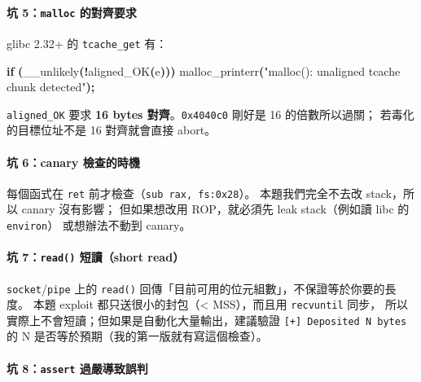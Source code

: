 \documentclass[10pt,a4paper]{article}
\newenvironment{Shaded}{\begin{snugshade}}{\end{snugshade}}
\newcommand{\ControlFlowTok}[1]{\textcolor[rgb]{0.13,0.29,0.53}{\textbf{#1}}}
\newcommand{\NormalTok}[1]{#1}
\newcommand{\OperatorTok}[1]{\textcolor[rgb]{0.81,0.36,0.00}{\textbf{#1}}}
\newcommand{\StringTok}[1]{\textcolor[rgb]{0.31,0.60,0.02}{#1}}
\renewenvironment{Shaded}{%
  \def\FrameCommand{\fboxsep=3.2pt\colorbox{shadecolor}}%
  \MakeFramed{\advance\hsize-\width\FrameRestore\small}%
}{%
  \endMakeFramed
}
\begin{document}
\paragraph{\texorpdfstring{坑 5：\texttt{malloc}
的對齊要求}{坑 5：malloc 的對齊要求}}\label{ux5751-5malloc-ux7684ux5c0dux9f4aux8981ux6c42}

glibc 2.32+ 的 \texttt{tcache\_\allowbreak{}get} 有：

\begin{Shaded}
\begin{Highlighting}[]
\ControlFlowTok{if} \OperatorTok{(}\NormalTok{\_\_unlikely}\OperatorTok{(!}\NormalTok{aligned\_OK}\OperatorTok{(}\NormalTok{e}\OperatorTok{)))}\NormalTok{ malloc\_printerr}\OperatorTok{(}\StringTok{"malloc(): unaligned tcache chunk detected"}\OperatorTok{);}
\end{Highlighting}
\end{Shaded}

\texttt{aligned\_\allowbreak{}OK} 要求 \textbf{16 bytes 對齊}。\texttt{0x4040c0}
剛好是 16 的倍數所以過關； 若毒化的目標位址不是 16 對齊就會直接 abort。

\paragraph{坑 6：canary
檢查的時機}\label{ux5751-6canary-ux6aa2ux67e5ux7684ux6642ux6a5f}

每個函式在 \texttt{ret} 前才檢查（\texttt{sub\ \allowbreak{}rax,\allowbreak{}\ \allowbreak{}fs:\allowbreak{}0x28}）。
本題我們完全不去改 stack，所以 canary 沒有影響； 但如果想改用
ROP，就必須先 leak stack（例如讀 libc 的 \texttt{environ}）
或想辦法不動到 canary。

\paragraph{\texorpdfstring{坑 7：\texttt{read()} 短讀（short
read）}{坑 7：read() 短讀（short read）}}\label{ux5751-7read-ux77edux8b80short-read}

\texttt{socket}/\texttt{pipe} 上的 \texttt{read()}
回傳「目前可用的位元組數」，不保證等於你要的長度。 本題 exploit
都只送很小的封包（\textless{} MSS），而且用 \texttt{recvuntil} 同步，
所以實際上不會短讀；但如果是自動化大量輸出，建議驗證
\texttt{{[}+{]}\ \allowbreak{}Deposited\ \allowbreak{}N\ \allowbreak{}bytes} 的 N
是否等於預期（我的第一版就有寫這個檢查）。

\paragraph{\texorpdfstring{坑 8：\texttt{assert}
過嚴導致誤判}{坑 8：assert 過嚴導致誤判}}\label{ux5751-8assert-ux904eux56b4ux5c0eux81f4ux8aa4ux5224}
\end{document}
